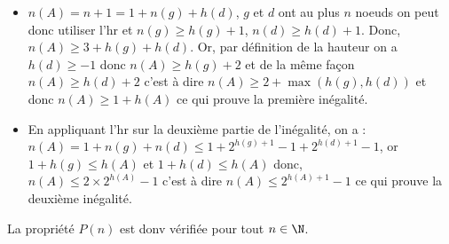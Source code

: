 \documentclass[11pt,a4paper]{article}
\begin{document}
\begin{Exercise}[title={Question de cours}]
{\begin{itemize}
			      \begin{itemize}
				      \item $n(A) = n+1 = 1 + n(g) + h(d)$, $g$ et $d$ ont au plus $n$ noeuds on peut donc utiliser l'{\sc hr} et $n(g) \geqslant h(g)+1$, $n(d) \geqslant h(d)+1$. Donc, $ n(A) \geqslant 3 + h(g) + h(d)$. Or, par définition de la hauteur on a $h(d) \geqslant -1$  donc $n(A) \geqslant h(g) +2$ et de la même façon $n(A) \geqslant h(d) +2$ c'est à dire $n(A) \geqslant 2 + \max(h(g),h(d))$ et donc $n(A) \geqslant 1 + h(A)$ ce qui prouve la première inégalité.
				      \item En appliquant l'{\sc hr} sur la deuxième partie de l'inégalité, on a : \\$n(A) = 1 + n(g) + n(d) \leqslant 1 + 2^{h(g)+1} - 1 + 2^{h(d)+1} -1$, or $ 1 + h(g) \leqslant h(A)$ et $1+ h(d) \leqslant h(A)$ donc, \\
				            $n(A) \leqslant 2 \times  2^{h(A)} -1$ c'est à dire $n(A) \leqslant 2^{h(A)+1} - 1$ ce qui prouve la deuxième inégalité.
			      \end{itemize}
		\end{itemize}
        La propriété $P(n)$ est donv vérifiée pour tout $n \in \N$.
	}
\end{Exercise}
\end{document}
